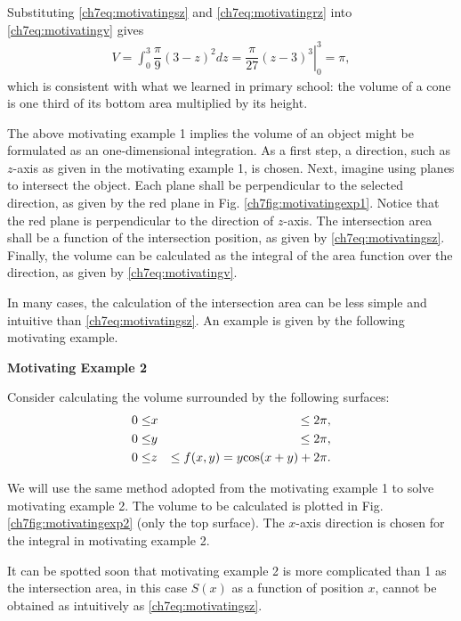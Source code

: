 Substituting \eqref{ch7eq:motivatingsz} and \eqref{ch7eq:motivatingrz} into \eqref{ch7eq:motivatingv} gives
\begin{eqnarray}
  V = \int_{0}^{3} \dfrac{\pi}{9} \left(3-z\right)^2 dz
  = \left.\dfrac{\pi}{27}(z-3)^3 \right|_0^3
  = \pi, \nonumber
\end{eqnarray}
which is consistent with what we learned in primary school: the volume of a cone is one third of its bottom area multiplied by its height.

The above motivating example 1 implies the volume of an object might be formulated as an one-dimensional integration. As a first step, a direction, such as $z$-axis as given in the motivating example 1, is chosen. Next, imagine using planes to intersect the object. Each plane shall be perpendicular to the selected direction, as given by the red plane in Fig. \ref{ch7fig:motivatingexp1}. Notice that the red plane is perpendicular to the direction of $z$-axis. The intersection area shall be a function of the intersection position, as given by \eqref{ch7eq:motivatingsz}. Finally, the volume can be calculated as the integral of the area function over the direction, as given by \eqref{ch7eq:motivatingv}.

In many cases, the calculation of the intersection area can be less simple and intuitive than \eqref{ch7eq:motivatingsz}. An example is given by the following motivating example.

\begin{mdframed}
	\noindent \textbf{Motivating Example 2}
	
	Consider calculating the volume surrounded by the following surfaces:
	\begin{eqnarray}
		0\leq &x& \leq 2\pi, \nonumber \\
		0\leq &y& \leq 2\pi, \nonumber \\
		0\leq &z& \leq f(x,y) = y\textup{cos}(x+y)+2\pi. \label{ch7eq:motivatingexp2f}
	\end{eqnarray}
	
\end{mdframed}

We will use the same method adopted from the motivating example 1 to solve motivating example 2. The volume to be calculated is plotted in Fig. \ref{ch7fig:motivatingexp2} (only the top surface). The $x$-axis direction is chosen for the integral in motivating example 2.

It can be spotted soon that motivating example 2 is more complicated than 1 as the intersection area, in this case $S(x)$ as a function of position $x$, cannot be obtained as intuitively as \eqref{ch7eq:motivatingsz}.

